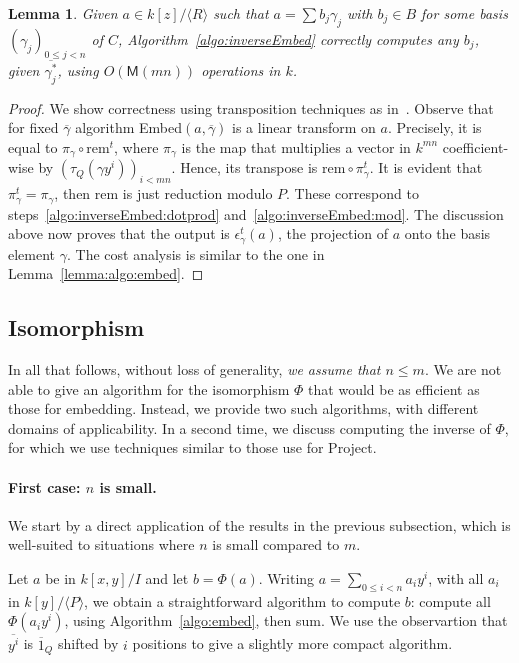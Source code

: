 \documentclass[12pt]{article}
\def\M {\ensuremath{\mathsf{M}}}
\def\rem {\ensuremath{\mathrm{rem}}}
\newcommand{\ang}[1]{\langle#1\rangle}
\newcommand{\dual}[1]{\overline{#1}}
\newtheorem{Lemma}{Lemma}
\begin{document}
\begin{Lemma}
  Given $a\in k[z]/\ang{R}$ such that $a=\sum b_j\gamma_j$ with
  $b_j\in B$ for some basis $(\gamma_j)_{0\le j<n}$ of $C$,
  Algorithm~\ref{algo:inverseEmbed} correctly computes any $b_j$,
  given $\dual{\gamma_j^\ast}$, using $O(\M(mn))$ operations in $k$.
\end{Lemma}
\begin{proof}
  We show correctness using transposition techniques as
  in~\cite{bostan+lecerf+schost:tellegen}. Observe that for fixed
  $\dual{\gamma}$ algorithm Embed$(a,\dual{\gamma})$ is a linear
  transform on $a$. Precisely, it is equal to $\pi_\gamma\circ\rem^t$,
  where $\pi_\gamma$ is the map that multiplies a vector in $k^{mn}$
  coefficient-wise by $(\tau_Q(\gamma y^i))_{i<mn}$. Hence, its
  transpose is $\rem\circ\pi_\gamma^t$. It is evident that
  $\pi_\gamma^t=\pi_\gamma$, then $\rem$ is just reduction modulo
  $P$. These correspond to steps~\ref{algo:inverseEmbed:dotprod}
  and~\ref{algo:inverseEmbed:mod}. The discussion above now proves
  that the output is $\epsilon_\gamma^t(a)$, the projection of $a$
  onto the basis element $\gamma$.  The cost analysis is similar to
  the one in Lemma~\ref{lemma:algo:embed}.
\end{proof}



\subsection{Isomorphism} 

In all that follows, without loss of generality, {\em we assume that
  $n\le m$}. We are not able to give an algorithm for the isomorphism
$\Phi$ that would be as efficient as those for embedding. Instead, we
provide two such algorithms, with different domains of applicability.
In a second time, we discuss computing the inverse of $\Phi$, for
which we use techniques similar to those use for Project.

\paragraph{First case: $n$ is small.}
We start by a direct application of the results in the previous
subsection, which is well-suited to situations where $n$ is small compared to $m$. 

Let $a$ be in $k[x,y]/I$ and let $b=\Phi(a)$. Writing $a=\sum_{0 \le i
  < n} a_i y^i$, with all $a_i$ in $k[y]/\langle P \rangle$, we obtain
a straightforward algorithm to compute $b$: compute all
$\Phi(a_iy^i)$, using Algorithm~\ref{algo:embed}, then sum. We use the
observartion that $\dual{y^i}$ is $\dual{1}_Q$ shifted by $i$
positions to give a slightly more compact algorithm.
\end{document}
